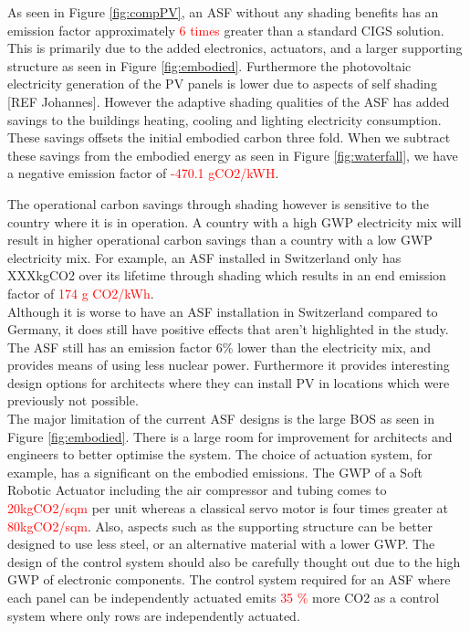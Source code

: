 


As seen in Figure \ref{fig:compPV}, an ASF without any shading benefits has an emission factor approximately \textcolor{red}{6 times } greater than a standard CIGS solution. This is primarily due to the added electronics, actuators, and a larger supporting structure as seen in Figure \ref{fig:embodied}. Furthermore the photovoltaic electricity generation of the PV panels is lower due to aspects of self shading [REF Johannes]. However the adaptive shading qualities of the ASF has added savings to the buildings heating, cooling and lighting electricity consumption. These savings offsets the initial embodied carbon three fold. When we subtract these savings from the embodied energy as seen in Figure \ref{fig:waterfall}, we have a negative emission factor of \textcolor{red}{-470.1 gCO2/kWH}. 

The operational carbon savings through shading however is sensitive to the country where it is in operation. A country with a high GWP electricity mix will result in higher operational carbon savings than a country with a low GWP electricity mix. For example, an ASF installed in Switzerland only has XXXkgCO2 over its lifetime through shading which results in an end emission factor of \textcolor{red}{174 g CO2/kWh}. \\



Although it is worse to have an ASF installation in Switzerland compared to Germany, it does still have positive effects that aren't highlighted in the study. The ASF still has an emission factor 6\% lower than the electricity mix, and provides means of using less nuclear power. Furthermore it provides interesting design options for architects where they can install PV in locations which were previously not possible.  \\

The major limitation of the current ASF designs is the large BOS as seen in Figure \ref{fig:embodied}. There is a large room for improvement for architects and engineers to better optimise the system. The choice of actuation system, for example, has a significant on the embodied emissions. The GWP of a Soft Robotic Actuator including the air compressor and tubing comes to \textcolor{red}{20kgCO2/sqm} per unit whereas a classical servo motor is four times greater at \textcolor{red}{80kgCO2/sqm}. Also, aspects such as the supporting structure can be better designed to use less steel, or an alternative material with a lower GWP. The design of the control system should also be carefully thought out due to the high GWP of electronic components. The control system required for an ASF where each panel can be independently actuated emits \textcolor{red}{35 \%} more CO2 as a control system where only rows are independently actuated. 





